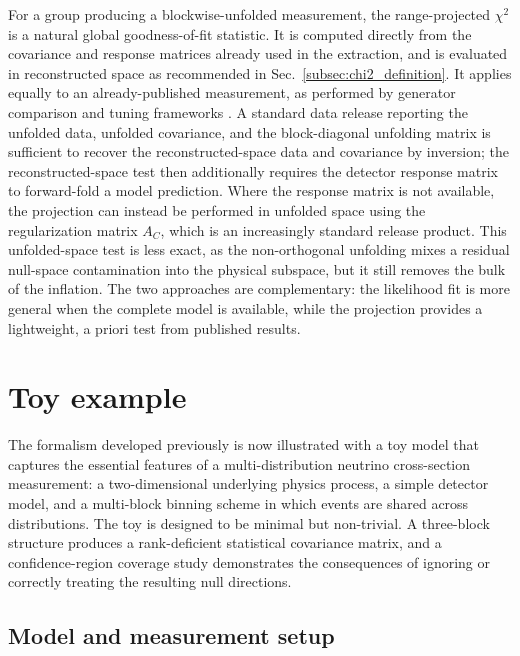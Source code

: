 \documentclass[a4paper,11pt]{article}
\begin{document}
For a group producing a blockwise-unfolded measurement, the range-projected $\chi^2$ is a natural global goodness-of-fit statistic. It is computed directly from the covariance and response matrices already used in the extraction, and is evaluated in reconstructed space as recommended in Sec.~\ref{subsec:chi2_definition}. It applies equally to an already-published measurement, as performed by generator comparison and tuning frameworks \cite{Stowell:2016jfr}. A standard data release reporting the unfolded data, unfolded covariance, and the block-diagonal unfolding matrix is sufficient to recover the reconstructed-space data and covariance by inversion; the reconstructed-space test then additionally requires the detector response matrix to forward-fold a model prediction. Where the response matrix is not available, the projection can instead be performed in unfolded space using the regularization matrix $A_C$, which is an increasingly standard release product. This unfolded-space test is less exact, as the non-orthogonal unfolding mixes a residual null-space contamination into the physical subspace, but it still removes the bulk of the inflation. The two approaches are complementary: the likelihood fit is more general when the complete model is available, while the projection provides a lightweight, a priori test from published results.

\section{Toy example}
\label{sec:toy}

The formalism developed previously is now illustrated with a toy model that captures the essential features of a multi-distribution neutrino cross-section measurement: a two-dimensional underlying physics process, a simple detector model, and a multi-block binning scheme in which events are shared across distributions. The toy is designed to be minimal but non-trivial. A three-block structure produces a rank-deficient statistical covariance matrix, and a confidence-region coverage study demonstrates the consequences of ignoring or correctly treating the resulting null directions.

\subsection{Model and measurement setup}
\end{document}
